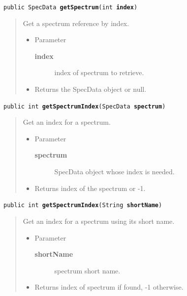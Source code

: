 \documentclass[twoside,11pt]{article}
\renewcommand{\_}{\texttt{\symbol{95}}}
\newcommand{\method}[1]{\texttt{#1}}
\newenvironment{desc}{\begin{quote}}{\end{quote}}
\begin{document}
\method{public SpecData \textbf{getSpectrum}(\texttt{int} \textbf{index})\label{l293}\label{l294}}
\begin{desc}Get a spectrum reference by index.
\begin{itemize}
\item{Parameter
  \begin{description}
   \item[\textbf{index}]{index of spectrum to retrieve.}
  \end{description}}
\end{itemize}
\begin{itemize}
\item{Returns the SpecData object or null. }
\end{itemize}
\end{desc}

\method{public int \textbf{getSpectrumIndex}(\texttt{SpecData} \textbf{spectrum})\label{l295}\label{l296}}
\begin{desc}Get an index for a spectrum.
\begin{itemize}
\item{Parameter
  \begin{description}
   \item[\textbf{spectrum}]{SpecData object whose index is needed.}
  \end{description}}
\end{itemize}
\begin{itemize}
\item{Returns index of the spectrum or -1. }
\end{itemize}
\end{desc}

\method{public int \textbf{getSpectrumIndex}(\texttt{String} \textbf{shortName})\label{l297}\label{l298}}
\begin{desc}Get an index for a spectrum using its short name.
\begin{itemize}
\item{Parameter
  \begin{description}
   \item[\textbf{shortName}]{spectrum short name.}
  \end{description}}
\end{itemize}
\begin{itemize}
\item{Returns index of spectrum if found, -1 otherwise. }
\end{itemize}
\end{desc}
\end{document}
